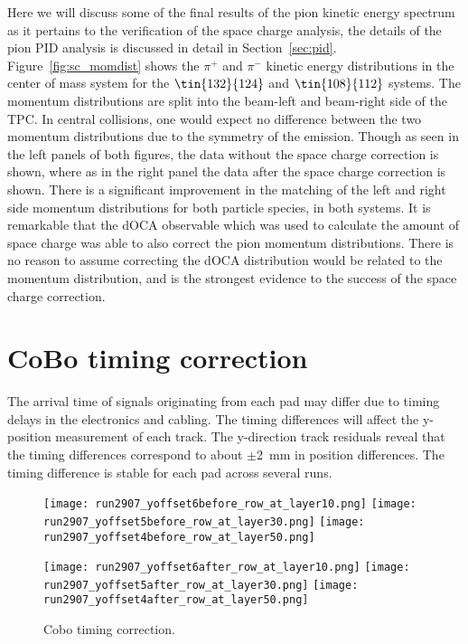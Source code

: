 Here we will discuss some of the final results of the pion kinetic energy spectrum as it pertains to the verification of the space charge analysis,  the details of the pion PID analysis is discussed in detail in Section~\ref{sec:pid}. Figure~\ref{fig:sc_momdist} shows the $\pi^+$ and $\pi^-$ kinetic energy distributions in the center of mass system for the $\tin{132}{124}$ and $\tin{108}{112}$ systems. The momentum distributions are split into the beam-left and beam-right side of the TPC. In central collisions, one would expect no difference between the two momentum distributions due to the symmetry of the emission. Though as seen in the left panels of both figures, the data without the space charge correction is shown, where as in the right panel the data after the space charge correction is shown. There is a significant improvement in the matching of the left and right side momentum distributions for both particle species, in both systems.   It is remarkable that the dOCA observable which was used to calculate the amount of space charge was able to also correct the pion momentum distributions. There is no reason to assume correcting the dOCA distribution would be related to the momentum distribution, and is the strongest evidence to the success of the space charge correction.



\section{CoBo timing correction}
The arrival time of signals originating from each pad may differ due to timing delays in the electronics and cabling. The timing differences will affect the y-position measurement of each track. The y-direction track residuals reveal that the timing differences correspond to about $\pm$\SI{2}{\milli\metre} in position differences. The timing difference is stable for each pad across several runs.

\begin{figure}[!htb]
  \begin{center}
    \texttt{[image: run2907\_yoffset6before\_row\_at\_layer10.png]}
    \texttt{[image: run2907\_yoffset5before\_row\_at\_layer30.png]}
    \texttt{[image: run2907\_yoffset4before\_row\_at\_layer50.png]}
 
    \texttt{[image: run2907\_yoffset6after\_row\_at\_layer10.png]}
    \texttt{[image: run2907\_yoffset5after\_row\_at\_layer30.png]}
    \texttt{[image: run2907\_yoffset4after\_row\_at\_layer50.png]}
 
    \caption{Cobo timing correction.}
  \end{center}
  \label{fig:coboCorr}
\end{figure}



